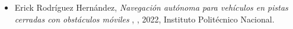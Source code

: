 \begin{itemize} 
\item Erick Rodríguez Hernández, \textit{ Navegación autónoma para vehículos en pistas cerradas con obstáculos móviles }, \href{ https://jivg.org/wp-content/uploads/2022/08/2022_phd_Rodriguez.pdf }{\faFilePdfO}, 2022, Instituto Politécnico Nacional. 
\end{itemize} 
